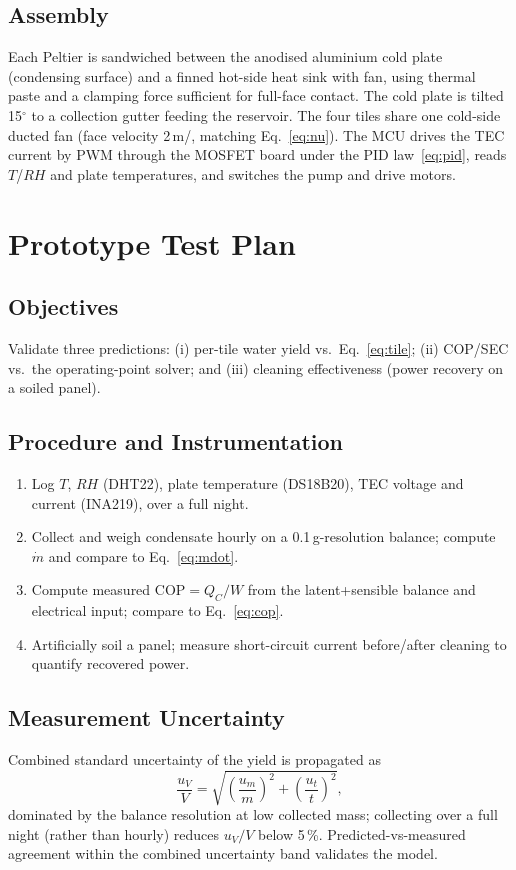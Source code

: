 \documentclass[12pt,a4paper]{report}
\newcommand{\ang}[1]{#1\ensuremath{^{\circ}}}
\newcommand{\SI}[2]{#1\,\mbox{#2}}
\newcommand{\per}{/}
\newcommand{\meter}{m}\newcommand{\metre}{m}
\newcommand{\gram}{g}\newcommand{\kg}{kg}\newcommand{\kilogram}{kg}
\newcommand{\percent}{\%}
\begin{document}
\section{Assembly}
Each Peltier is sandwiched between the anodised aluminium cold plate (condensing
surface) and a finned hot-side heat sink with fan, using thermal paste and a
clamping force sufficient for full-face contact. The cold plate is tilted
\ang{15} to a collection gutter feeding the reservoir. The four tiles share one
cold-side ducted fan (face velocity \SI{2}{\meter\per\second}, matching
Eq.~\eqref{eq:nu}). The MCU drives the TEC current by PWM through the MOSFET
board under the PID law~\eqref{eq:pid}, reads $T$/$RH$ and plate temperatures,
and switches the pump and drive motors.

\chapter{Prototype Test Plan}
\label{ch:test}

\section{Objectives}
Validate three predictions: (i) per-tile water yield vs.\ Eq.~\eqref{eq:tile};
(ii) COP/SEC vs.\ the operating-point solver; and (iii) cleaning effectiveness
(power recovery on a soiled panel).

\section{Procedure and Instrumentation}
\begin{enumerate}
  \item Log $T$, $RH$ (DHT22), plate temperature (DS18B20), TEC voltage and
        current (INA219), over a full night.
  \item Collect and weigh condensate hourly on a \SI{0.1}{\gram}-resolution
        balance; compute $\dot m$ and compare to Eq.~\eqref{eq:mdot}.
  \item Compute measured $\mathrm{COP}=Q_C/W$ from the latent+sensible balance
        and electrical input; compare to Eq.~\eqref{eq:cop}.
  \item Artificially soil a panel; measure short-circuit current before/after
        cleaning to quantify recovered power.
\end{enumerate}

\section{Measurement Uncertainty}
Combined standard uncertainty of the yield is propagated as
\begin{equation}
  \frac{u_V}{V}=\sqrt{\left(\frac{u_m}{m}\right)^2+\left(\frac{u_t}{t}\right)^2},
  \label{eq:uncert}
\end{equation}
dominated by the balance resolution at low collected mass; collecting over a full
night (rather than hourly) reduces $u_V/V$ below \SI{5}{\percent}.
Predicted-vs-measured agreement within the combined uncertainty band validates
the model.
\end{document}
